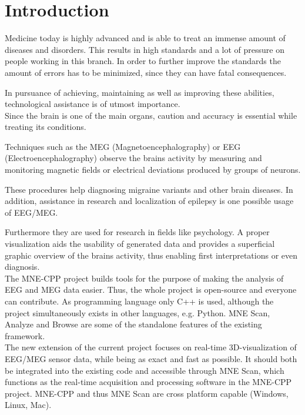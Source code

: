 
\section{Introduction}

	Medicine today is highly advanced and is able to treat an immense amount of diseases and disorders.
	This results in high standards and a lot of pressure on people working in this branch. In order to further improve the 			standards the amount of errors has to be minimized, since they can have fatal consequences. %

	In pursuance of achieving, maintaining as well as improving these abilities, technological assistance is of utmost 				importance.\\  

	Since the brain is one of the main organs, caution and accuracy is essential while treating its conditions. 
	
	Techniques such as the MEG (Magnetoencephalography) or EEG (Electroencephalography) observe the brains activity by 				measuring and monitoring magnetic fields or electrical deviations produced by groups of neurons.

	These procedures help diagnosing migraine variants and other brain diseases. In addition, assistance in 				research and localization of epilepsy is one possible usage of EEG/MEG. 
	 
	Furthermore they are used for research in fields like psychology.
	A proper visualization aids the usability of generated data and provides a superficial graphic overview of the brains 			activity, thus enabling first interpretations or even diagnosis.\\
	

	The MNE-CPP  project builds tools for the purpose of making the analysis of EEG and MEG data easier.
	Thus, the whole project is open-source and everyone can contribute. As programming language only C++ is used, although the 	project simultaneously exists in other languages, e.g. Python. 
	MNE Scan, Analyze and Browse are some of the standalone features of the existing framework. \\

	The new extension of the current project focuses on real-time 3D-visualization of EEG/MEG sensor data, while being as 			exact and fast as possible. It should both be integrated into the existing code and accessible through MNE Scan, which 			functions as the real-time acquisition and processing software in the MNE-CPP project. MNE-CPP and thus MNE Scan are cross 	platform capable (Windows, Linux, Mac). 
  
